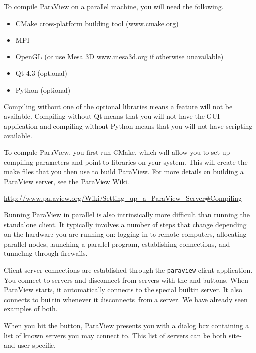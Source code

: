 To compile ParaView on a parallel machine, you will need the following.

\begin{itemize}
\item CMake cross-platform building tool
  (\href{http://www.cmake.org}{www.cmake.org})
\item MPI
\item OpenGL (or use Mesa 3D \href{http://www.mesa3d.org}{www.mesa3d.org}
  if otherwise unavailable)
\item Qt 4.3 (optional)
\item Python (optional)
\end{itemize}

Compiling without one of the optional libraries means a feature will not be
available.  Compiling without Qt means that you will not have the GUI
application and compiling without Python means that you will not have
scripting available.

To compile ParaView, you first run CMake, which will allow you to set up
compiling parameters and point to libraries on your system.  This will
create the make files that you then use to build ParaView.  For more
details on building a ParaView server, see the ParaView Wiki.

{
  \footnotesize
  \href{http://www.paraview.org/Wiki/Setting_up_a_ParaView_Server#Compiling}{http://www.paraview.org/Wiki/Setting\_up\_a\_ParaView\_Server\#Compiling}
}

Running ParaView in parallel is also intrinsically more difficult than
running the standalone client.  It typically involves a number of steps
that change depending on the hardware you are running on: logging in to
remote computers, allocating parallel nodes, launching a parallel program,
establishing connections, and tunneling through firewalls.

Client-server connections are established through the \texttt{paraview}
client application.  You connect to servers and disconnect from servers
with the \connect and \disconnect buttons.  When ParaView starts, it
automatically connects to the special builtin server.  It also connects to
builtin whenever it disconnects~\disconnect from a server.  We have already
seen examples of both.

When you hit the \connect button, ParaView presents you with a dialog box
containing a list of known servers you may connect to.  This list of
servers can be both site- and user-specific.

